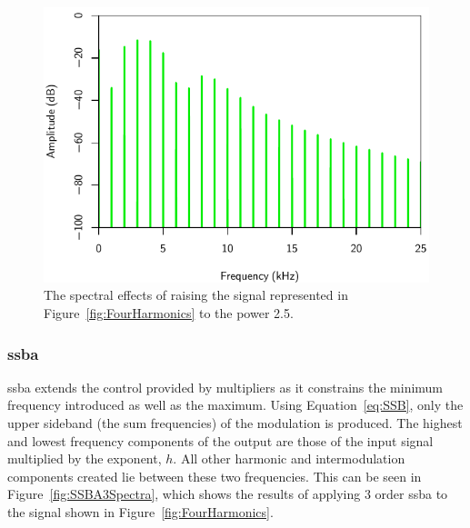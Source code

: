 			\begin{figure}[h!]
				\centering
				\includegraphics{chapter5/Images/RaisedToTwoAndAHalfSpectra.pdf}
				\caption{The spectral effects of raising the signal represented in
					Figure~\ref{fig:FourHarmonics} to the power 2.5.}
				\label{fig:TwoAndAHalfSpectra}
			\end{figure}

		\subsubsection*{\acrshort{ssba}}
			\acrshort{ssba} extends the control provided by multipliers as it constrains the minimum frequency
			introduced as well as the maximum. Using Equation~\ref{eq:SSB}, only the upper sideband (the sum
			frequencies) of the modulation is produced. The highest and lowest frequency components of the
			output are those of the input signal multiplied by the exponent, $h$. All other harmonic and
			intermodulation components created lie between these two frequencies. This can be seen in
			Figure~\ref{fig:SSBA3Spectra}, which shows the results of applying $3$ order
			\acrshort{ssba} to the signal shown in Figure~\ref{fig:FourHarmonics}.
			
